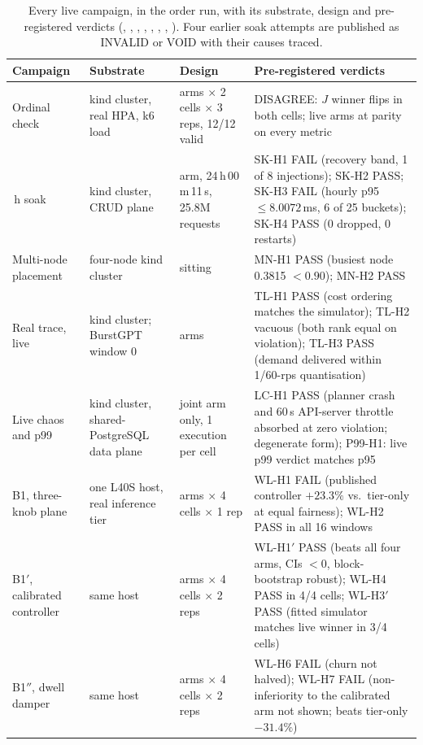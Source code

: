 \begin{table}[htbp]
\centering\tablefontsmall\setlength{\tabcolsep}{4pt}
\begin{tabularx}{\textwidth}{@{}>{\raggedright\arraybackslash}p{}>{\raggedright\arraybackslash}p{}>{\raggedright\arraybackslash}p{}>{\raggedright\arraybackslash}X@{}}
\toprule
\textbf{Campaign} & \textbf{Substrate} & \textbf{Design} & \textbf{Pre-registered verdicts} \\
\midrule
Ordinal check & kind cluster, real HPA, k6 load & 2 arms $\times$ 2 cells $\times$ 3 reps, 12/12 valid & DISAGREE: $J$ winner flips in both cells; live arms at parity on every metric \\
24\,h soak & kind cluster, CRUD plane & 1 arm, 24\,h\,00\,m\,11\,s, 25.8M requests & SK-H1 FAIL (recovery band, 1 of 8 injections); SK-H2 PASS; SK-H3 FAIL (hourly p95 $\le 8.0072$\,ms, 6 of 25 buckets); SK-H4 PASS (0 dropped, 0 restarts) \\
Multi-node placement & four-node kind cluster & 1 sitting & MN-H1 PASS (busiest node 0.3815 $< 0.90$); MN-H2 PASS \\
Real trace, live & kind cluster; BurstGPT window 0 & 2 arms & TL-H1 PASS (cost ordering matches the simulator); TL-H2 vacuous (both rank equal on violation); TL-H3 PASS (demand delivered within 1/60-rps quantisation) \\
Live chaos and p99 & kind cluster, shared-PostgreSQL data plane & joint arm only, 1 execution per cell & LC-H1 PASS (planner crash and 60\,s API-server throttle absorbed at zero violation; degenerate form); P99-H1: live p99 verdict matches p95 \\
B1, three-knob plane & one L40S host, real inference tier & 4 arms $\times$ 4 cells $\times$ 1 rep & WL-H1 FAIL (published controller $+23.3\%$ vs.\ tier-only at equal fairness); WL-H2 PASS in all 16 windows \\
B1$'$, calibrated controller & same host & 5 arms $\times$ 4 cells $\times$ 2 reps & WL-H1$'$ PASS (beats all four arms, CIs $< 0$, block-bootstrap robust); WL-H4 PASS in 4/4 cells; WL-H3$'$ PASS (fitted simulator matches live winner in 3/4 cells) \\
B1$''$, dwell damper & same host & 3 arms $\times$ 4 cells $\times$ 2 reps & WL-H6 FAIL (churn not halved); WL-H7 FAIL (non-inferiority to the calibrated arm not shown; beats tier-only $-31.4\%$) \\
\bottomrule
\end{tabularx}
\caption{Every live campaign, in the order run, with its substrate, design
and pre-registered verdicts (,
, ,
, ,
, ,
). Four earlier soak attempts are
published as INVALID or VOID with their causes traced.}
\label{tab:live-campaigns}
\end{table}

